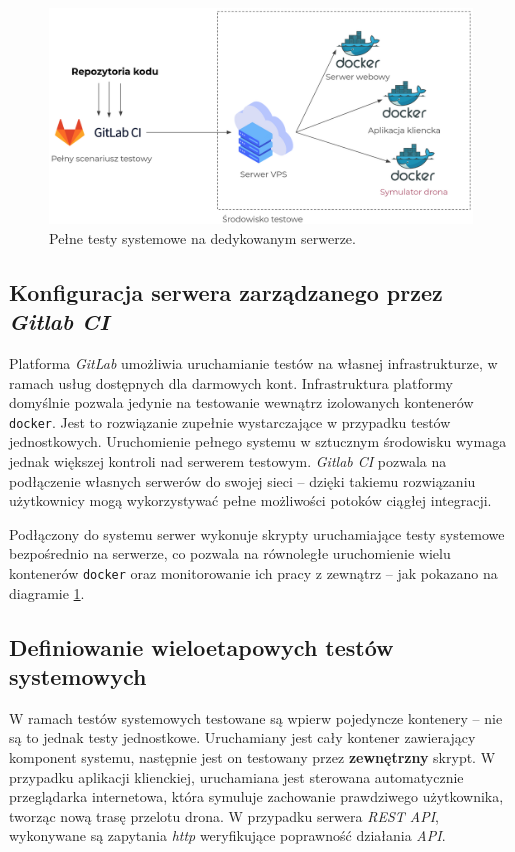 \begin{figure}[H]
	\centering
	\includegraphics[width=\linewidth]{rys05/integration_tests_diagram.png}
    \caption{
        Pełne testy systemowe na dedykowanym serwerze.
    }
	\label{system_tests_diagram}
\end{figure}

\subsection{Konfiguracja serwera zarządzanego przez \textit{Gitlab CI}}

Platforma \textit{GitLab} umożliwia uruchamianie testów na własnej
infrastrukturze, w ramach usług dostępnych dla darmowych kont.
Infrastruktura platformy domyślnie pozwala jedynie
na testowanie wewnątrz izolowanych kontenerów \texttt{docker}.
Jest to rozwiązanie zupełnie wystarczające w przypadku testów jednostkowych.
Uruchomienie pełnego systemu w sztucznym środowisku wymaga jednak
większej kontroli nad serwerem testowym. \textit{Gitlab CI} pozwala
na podłączenie własnych serwerów do swojej sieci -- dzięki takiemu rozwiązaniu
użytkownicy mogą wykorzystywać pełne możliwości potoków ciągłej integracji.

Podłączony do systemu serwer wykonuje skrypty uruchamiające testy systemowe 
bezpośrednio na serwerze, co pozwala na równoległe uruchomienie wielu kontenerów 
\texttt{docker} oraz monitorowanie ich pracy z zewnątrz -- jak pokazano
na diagramie \ref{system_tests_diagram}.

\subsection{Definiowanie wieloetapowych testów systemowych}

W ramach testów systemowych testowane są wpierw pojedyncze kontenery --
nie są to jednak testy jednostkowe. Uruchamiany jest cały kontener zawierający
komponent systemu, następnie jest on testowany przez \textbf{zewnętrzny} skrypt.
W przypadku aplikacji klienckiej, uruchamiana jest sterowana automatycznie 
przeglądarka internetowa, która symuluje zachowanie prawdziwego użytkownika,
tworząc nową trasę przelotu drona. W przypadku serwera \textit{REST API}, wykonywane
są zapytania \textit{http} weryfikujące poprawność działania \textit{API}.


